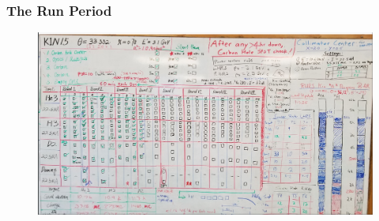 \documentclass{beamer}
\begin{document}
\begin{frame}
\frametitle{The Run Period}
	\vspace{-20pt}
	\begin{figure}
		\includegraphics[width=12.5cm]{../images/whiteboard_2_20}
	\end{figure}
\end{frame}
\end{document}
